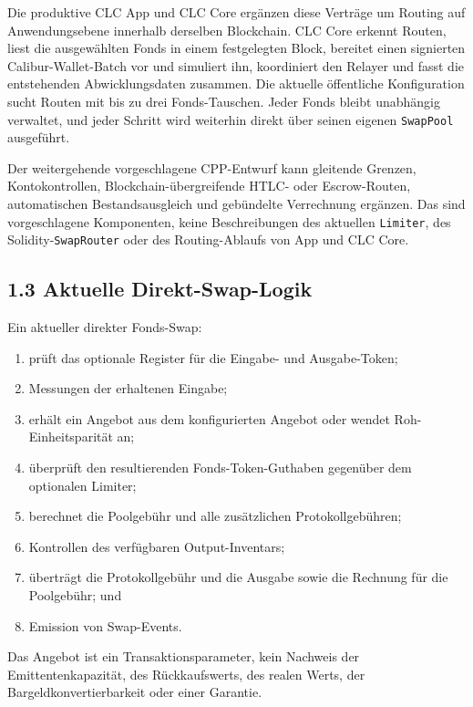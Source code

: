 \documentclass[11pt]{article}
\begin{document}
Die produktive CLC App und CLC Core ergänzen diese Verträge um Routing auf Anwendungsebene innerhalb derselben Blockchain. CLC Core erkennt Routen, liest die ausgewählten Fonds in einem festgelegten Block, bereitet einen signierten Calibur-Wallet-Batch vor und simuliert ihn, koordiniert den Relayer und fasst die entstehenden Abwicklungsdaten zusammen. Die aktuelle öffentliche Konfiguration sucht Routen mit bis zu drei Fonds-Tauschen. Jeder Fonds bleibt unabhängig verwaltet, und jeder Schritt wird weiterhin direkt über seinen eigenen \texttt{SwapPool} ausgeführt.

Der weitergehende vorgeschlagene CPP-Entwurf kann gleitende Grenzen, Kontokontrollen, Blockchain-übergreifende HTLC- oder Escrow-Routen, automatischen Bestandsausgleich und gebündelte Verrechnung ergänzen. Das sind vorgeschlagene Komponenten, keine Beschreibungen des aktuellen \texttt{Limiter}, des Solidity-\texttt{SwapRouter} oder des Routing-Ablaufs von App und CLC Core.

\subsection*{1.3 Aktuelle Direkt-Swap-Logik}

Ein aktueller direkter Fonds-Swap:

\begin{enumerate}[leftmargin=*]
\item prüft das optionale Register für die Eingabe- und Ausgabe-Token;
\item Messungen der erhaltenen Eingabe;
\item erhält ein Angebot aus dem konfigurierten Angebot oder wendet Roh-Einheitsparität an;
\item überprüft den resultierenden Fonds-Token-Guthaben gegenüber dem optionalen Limiter;
\item berechnet die Poolgebühr und alle zusätzlichen Protokollgebühren;
\item Kontrollen des verfügbaren Output-Inventars;
\item überträgt die Protokollgebühr und die Ausgabe sowie die Rechnung für die Poolgebühr; und
\item Emission von Swap-Events.
\end{enumerate}
Das Angebot ist ein Transaktionsparameter, kein Nachweis der Emittentenkapazität, des Rückkaufswerts, des realen Werts, der Bargeldkonvertierbarkeit oder einer Garantie.
\end{document}
